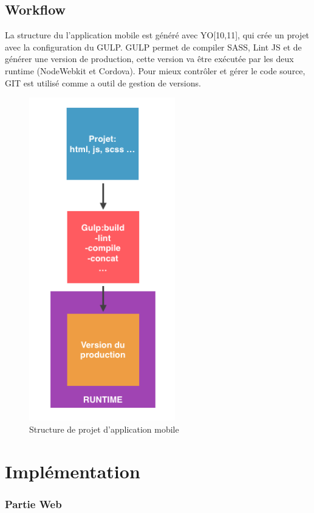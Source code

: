 \documentclass[12pt, ChapStyle1, oneside]{./Styles/Dea_Gsm}
\begin{document}
\subsection{Workflow}
La structure du l'application mobile est généré avec YO[10,11], qui crée un projet avec la configuration du GULP.
GULP permet de compiler SASS, Lint JS et de générer une version de production, cette version va être exécutée par les deux runtime (NodeWebkit et Cordova).
Pour mieux contrôler et gérer le code source, GIT est utilisé comme a outil de gestion de versions.
\begin{figure}[H]
    \centering
    \includegraphics[width=2.5in]{workflow}
    \caption{Structure de projet d'application mobile}
    \label{workflow}
\end{figure}

\section{Implémentation}
\subsubsection{Partie Web}
\end{document}
